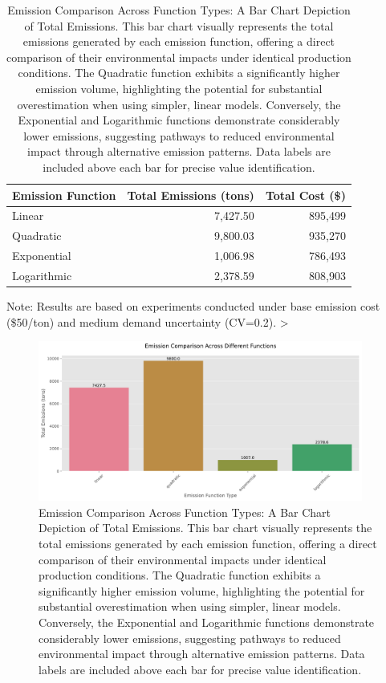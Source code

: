 \begin{table}[htbp]
    \centering
    \caption{Comparative Analysis of Emission Patterns: Total Emissions and Costs Across Different Emission Functions}
    \label{tab:emission_patterns_results}
    \begin{tabular}{lrr}
        \toprule
        Emission Function & Total Emissions (tons) & Total Cost (\$)\\
        \midrule
        Linear & 7,427.50 & 895,499 \\
        Quadratic & 9,800.03 & 935,270 \\
        Exponential & 1,006.98 & 786,493 \\
        Logarithmic & 2,378.59 & 808,903 \\
        \bottomrule
    \end{tabular}
    \footnotesize{Note: Results are based on experiments conducted under base emission cost (\$50/ton) and medium demand uncertainty (CV=0.2).}
\table>

\begin{figure}[htbp]
    \centering
    \includegraphics[width=0.95\textwidth]{images/emission_comparison.pdf}
    \caption{Emission Comparison Across Function Types: A Bar Chart Depiction of Total Emissions.
    This bar chart visually represents the total emissions generated by each emission function, offering a direct comparison of their environmental impacts under identical production conditions. The Quadratic function exhibits a significantly higher emission volume, highlighting the potential for substantial overestimation when using simpler, linear models.  Conversely, the Exponential and Logarithmic functions demonstrate considerably lower emissions, suggesting pathways to reduced environmental impact through alternative emission patterns. Data labels are included above each bar for precise value identification.}
    \label{fig:emission_comparison_bar}
\end{figure}



\end{table}

